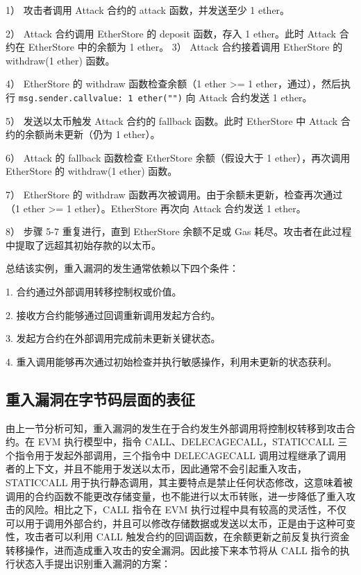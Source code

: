 \documentclass[print, master, vlined, timesmath]{DissertUESTC}
\begin{document}
1） 攻击者调用 Attack 合约的 attack 函数，并发送至少 1 ether。

2）  Attack 合约调用 EtherStore 的 deposit 函数，存入 1 ether。此时 Attack 合约在 EtherStore 中的余额为 1 ether。
3） Attack 合约接着调用 EtherStore 的 withdraw(1 ether) 函数。

4）  EtherStore 的 withdraw 函数检查余额（1 ether >= 1 ether，通过），然后执行 \texttt{msg.sender.call{value: 1 ether}("")}  向 Attack 合约发送 1 ether。

5） 发送以太币触发 Attack 合约的 fallback 函数。此时 EtherStore 中 Attack 合约的余额尚未更新（仍为 1 ether）。

6）  Attack 的 fallback 函数检查 EtherStore 余额（假设大于 1 ether），再次调用 EtherStore 的 withdraw(1 ether) 函数。

7） EtherStore 的 withdraw 函数再次被调用。由于余额未更新，检查再次通过（1 ether >= 1 ether）。EtherStore 再次向 Attack 合约发送 1 ether。

8）  步骤 5-7 重复进行，直到 EtherStore 余额不足或 Gas 耗尽。攻击者在此过程中提取了远超其初始存款的以太币。

总结该实例，重入漏洞的发生通常依赖以下四个条件：

1.  合约通过外部调用转移控制权或价值。

2.  接收方合约能够通过回调重新调用发起方合约。

3.  发起方合约在外部调用完成前未更新关键状态。

4.  重入调用能够再次通过初始检查并执行敏感操作，利用未更新的状态获利。

\subsection{重入漏洞在字节码层面的表征}

由上一节分析可知，重入漏洞的发生在于合约发生外部调用将控制权转移到攻击合约。在 EVM 执行模型中，指令 CALL、DELECAGECALL，STATICCALL 三个指令用于发起外部调用，三个指令中 DELECAGECALL 调用过程继承了调用者的上下文，并且不能用于发送以太币，因此通常不会引起重入攻击，STATICCALL 用于执行静态调用，其主要特点是禁止任何状态修改，这意味着被调用的合约函数不能更改存储变量，也不能进行以太币转账，进一步降低了重入攻击的风险。相比之下，CALL 指令在 EVM 执行过程中具有较高的灵活性，不仅可以用于调用外部合约，并且可以修改存储数据或发送以太币，正是由于这种可变性，攻击者可以利用 CALL 触发合约的回调函数，在余额更新之前反复执行资金转移操作，进而造成重入攻击的安全漏洞。因此接下来本节将从 CALL 指令的执行状态入手提出识别重入漏洞的方案：
\end{document}
